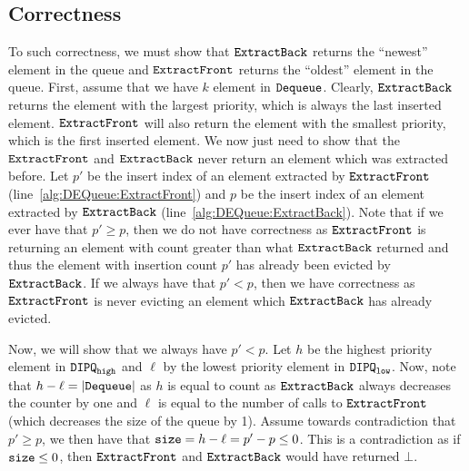 \subsection{Correctness}
To such correctness, we must show that $\texttt{ExtractBack}$ returns the ``newest'' element in the queue and $\texttt{ExtractFront}$ returns the ``oldest'' element in the queue.
First, assume that we have $k$ element in $\texttt{Dequeue}$. 
Clearly, $\texttt{ExtractBack}$ returns the element with the largest priority, which is always the last inserted element.
$\texttt{ExtractFront}$ will also return the element with the smallest priority, which is the first inserted element.
We now just need to show that the $\texttt{ExtractFront}$ and $\texttt{ExtractBack}$
never return an element which was extracted before.
Let $p'$ be the insert index of an element extracted by $\texttt{ExtractFront}$ (line~\ref{alg:DEQueue:ExtractFront}) and $p$ be the insert index of an element extracted by $\texttt{ExtractBack}$ (line~\ref{alg:DEQueue:ExtractBack}).
Note that if we ever have that $p' \geq p$, then we do not have correctness
as $\texttt{ExtractFront}$ is returning an element with count greater than what $\texttt{ExtractBack}$ returned
and thus the element with insertion count $p'$ has already been evicted by $\texttt{ExtractBack}$.
If we always have that $p' < p$, then we have correctness as $\texttt{ExtractFront}$ is never evicting an element
which $\texttt{ExtractBack}$ has already evicted.

Now, we will show that we always have $p' < p$.
Let $h$ be the highest priority element in $\texttt{DIPQ}_{\texttt{high}}$ and $\ell$ by the lowest priority element in $\texttt{DIPQ}_{\texttt{low}}$.
Now, note that $h - \ell = |\texttt{Dequeue}|$ as $h$ is equal to count as $\texttt{ExtractBack}$ always decreases the counter by one and
$\ell$ is equal to the number of calls to $\texttt{ExtractFront}$ (which decreases the size of the queue by 1).
Assume towards contradiction that $p' \geq p$, we then have that $\texttt{size} = h - \ell = p' - p \leq 0$.
This is a contradiction as if $\texttt{size} \leq 0$, then $\texttt{ExtractFront}$ and $\texttt{ExtractBack}$ would have returned $\bot$.